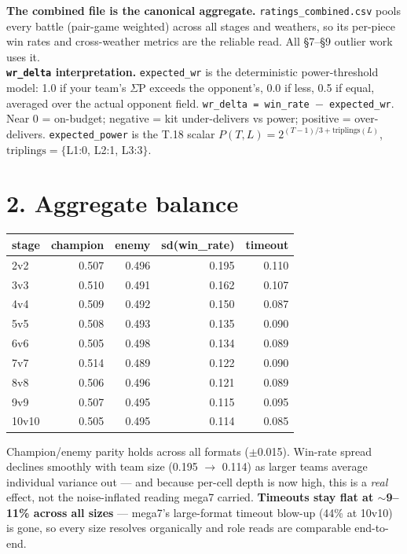\documentclass[10pt]{article}
\begin{document}
\textbf{The combined file is the canonical aggregate.} \texttt{ratings\_\allowbreak{}combined.\allowbreak{}csv} pools every battle (pair-game weighted) across all stages and weathers, so its per-piece win rates and cross-weather metrics are the reliable read. All \S{}7--\S{}9 outlier work uses it.\\

\textbf{\texttt{wr\_\allowbreak{}delta} interpretation.} \texttt{expected\_\allowbreak{}wr} is the deterministic power-threshold model: 1.0 if your team's $\Sigma$P exceeds the opponent's, 0.0 if less, 0.5 if equal, averaged over the actual opponent field. \texttt{wr\_\allowbreak{}delta = win\_\allowbreak{}rate $-$ expected\_\allowbreak{}wr}. Near 0 = on-budget; negative = kit under-delivers vs power; positive = over-delivers. \texttt{expected\_\allowbreak{}power} is the T.18 scalar $P(T,L) = 2^{(T-1)/3 + \mathrm{triplings}(L)}$, $\mathrm{triplings}=\{$L1:0, L2:1, L3:3$\}$.\\

\section*{2. Aggregate balance}

\medskip
\begin{tabularx}{\linewidth}{Lrrrr}
\toprule
\textbf{stage} & \textbf{champion} & \textbf{enemy} & \textbf{sd(win\_rate)} & \textbf{timeout} \\
\midrule
2v2 & 0.507 & 0.496 & 0.195 & 0.110 \\
3v3 & 0.510 & 0.491 & 0.162 & 0.107 \\
4v4 & 0.509 & 0.492 & 0.150 & 0.087 \\
5v5 & 0.508 & 0.493 & 0.135 & 0.090 \\
6v6 & 0.505 & 0.498 & 0.134 & 0.089 \\
7v7 & 0.514 & 0.489 & 0.122 & 0.090 \\
8v8 & 0.506 & 0.496 & 0.121 & 0.089 \\
9v9 & 0.507 & 0.495 & 0.115 & 0.095 \\
10v10 & 0.505 & 0.495 & 0.114 & 0.085 \\
\bottomrule
\end{tabularx}
\medskip

Champion/enemy parity holds across all formats ($\pm$0.015). Win-rate spread declines smoothly with team size (0.195 $\rightarrow$ 0.114) as larger teams average individual variance out --- and because per-cell depth is now high, this is a \emph{real} effect, not the noise-inflated reading mega7 carried. \textbf{Timeouts stay flat at $\sim$9--11\% across all sizes} --- mega7's large-format timeout blow-up (44\% at 10v10) is gone, so every size resolves organically and role reads are comparable end-to-end.\\
\end{document}
